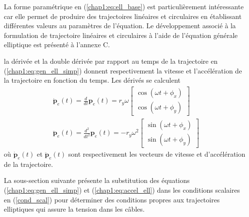 La forme paramétrique en (\ref{chap1:eq:ell_base}) est particulièrement intéressante car elle permet de produire des trajectoires linéaires et circulaires en établissant différentes valeurs au paramètres de l'équation. Le développement associé à la formulation de trajectoire linéaires et circulaires à l'aide de l'équation générale elliptique est présenté à l'annexe C. \par 
la dérivée et la double dérivée par rapport au temps de la trajectoire en (\ref{chap1:eq:gen_ell_simp}) donnent respectivement la  vitesse et l'accélération de la trajectoire en fonction du temps. Les dérivés se calculent
\begin{align}
\dot{\mathbf{p}}_e(t) = \frac{d}{dt}\mathbf{p}_e(t) = r_y\omega \begin{bmatrix}
\cos(\omega t + \phi_x)\\
\cos(\omega t + \phi_y)
\end{bmatrix}
\\
\ddot{\mathbf{p}}_e(t) = \frac{d^2}{dt^2}\mathbf{p}_e(t) = -r_y\omega^2 \begin{bmatrix}
\sin(\omega t + \phi_x)\\
\sin(\omega t + \phi_y)
\end{bmatrix} \label{chap1:eq:accel_ell}
\end{align}
où $\dot{\mathbf{p}}_e(t)$ et $\ddot{\mathbf{p}}_e(t)$ sont respectivement les vecteurs de vitesse et d'accélération de la trajectoire.\par 
La sous-section suivante présente la substitution des équations (\ref{chap1:eq:gen_ell_simp}) et (\ref{chap1:eq:accel_ell}) dans les conditions scalaires en (\ref{cond_scal}) pour déterminer des conditions propres aux trajectoires elliptiques qui assure la tension dans les câbles. 
